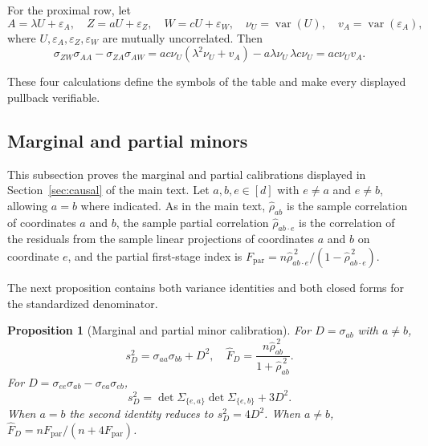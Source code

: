 \documentclass[12pt,a4paper]{article}
\theoremstyle{plain}
\newtheorem{proposition}{Proposition}
\theoremstyle{definition}
\newcommand{\var}{\operatorname{var}}
\newcommand{\eps}{\varepsilon}
\newcommand{\FD}{\widehat{F}_D}
\begin{document}
For the proximal row, let
\begin{equation*}
    A=\lambda U+\eps_A
    ,\quad
    Z=aU+\eps_Z
    ,\quad
    W=cU+\eps_W
    ,\quad
    \nu_U=\var(U)
    ,\quad
    v_A=\var(\eps_A)
    ,
\end{equation*}
where $U,\eps_A,\eps_Z,\eps_W$ are mutually uncorrelated.
Then
\begin{equation*}
    \sigma_{ZW}\sigma_{AA}-\sigma_{ZA}\sigma_{AW}
    =
    ac\nu_U(\lambda^2\nu_U+v_A)
    -a\lambda\nu_U\,\lambda c\nu_U
    =
    ac\nu_Uv_A
    .
\end{equation*}

These four calculations define the symbols of the table and make every displayed pullback verifiable.

\subsection{Marginal and partial minors}
\label{supp:minor-calibration}

This subsection proves the marginal and partial calibrations displayed in Section~\ref{sec:causal} of the main text.
Let $a,b,e\in[d]$ with $e\ne a$ and $e\ne b$, allowing $a=b$ where indicated.
As in the main text, $\hat{\rho}_{ab}$ is the sample correlation of coordinates $a$ and $b$, the sample partial correlation $\hat{\rho}_{ab\cdot e}$ is the correlation of the residuals from the sample linear projections of coordinates $a$ and $b$ on coordinate $e$, and the partial first-stage index is $F_{\mathrm{par}}=n\hat{\rho}_{ab\cdot e}^{\,2}/(1-\hat{\rho}_{ab\cdot e}^{\,2})$.

The next proposition contains both variance identities and both closed forms for the standardized denominator.

\begin{proposition}[Marginal and partial minor calibration]
\label{prop:minors}
    For $D=\sigma_{ab}$ with $a\ne b$,
    \begin{equation*}
        s_D^2
        =
        \sigma_{aa}\sigma_{bb}+D^2
        ,\quad
        \FD
        =
        \frac{n\hat{\rho}_{ab}^{\,2}}{1+\hat{\rho}_{ab}^{\,2}}
        .
    \end{equation*}
    For $D=\sigma_{ee}\sigma_{ab}-\sigma_{ea}\sigma_{eb}$,
    \begin{equation*}
        s_D^2
        =
        \det\Sigma_{\{e,a\}}\det\Sigma_{\{e,b\}}+3D^2
        .
    \end{equation*}
    When $a=b$ the second identity reduces to $s_D^2=4D^2$.
    When $a\ne b$, $\FD=nF_{\mathrm{par}}/(n+4F_{\mathrm{par}})$.
\end{proposition}
\end{document}
